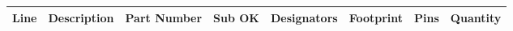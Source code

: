 \documentclass{article}
\begin{document}


\begin{center}
    \begin{longtable}{| r | p{6.0cm} | p{3.8cm} | l | p{3.8cm} | l | r | r |}
    \hline
	\multicolumn{1}{|l|}{\textbf{Line}} & \multicolumn{1}{l|}{\textbf{Description}} & \multicolumn{1}{l|}{\textbf{Part Number}} & \multicolumn{1}{l|}{\textbf{Sub OK}} & \multicolumn{1}{l|}{\textbf{Designators}} & \multicolumn{1}{l|}{\textbf{Footprint}} & \multicolumn{1}{r|}{\textbf{Pins}} & \multicolumn{1}{r|}{\textbf{Quantity}} \\ \hline	 
	\endhead
	
    \end{longtable}
\end{center}


\end{document}
